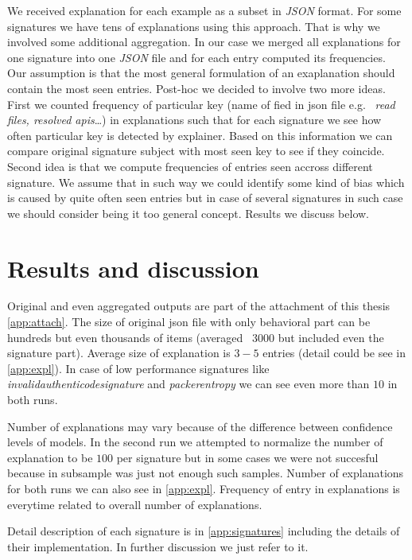 We received explanation for each example as a subset in \emph{JSON} format. For some signatures we have tens of explanations using this approach. That is why we involved some additional aggregation. In our case we merged all explanations for one signature into one \emph{JSON} file and for each entry computed its frequencies. Our assumption is that the most general formulation of an exaplanation should contain the most seen entries. Post-hoc we decided to involve two more ideas. First we counted frequency of particular key (name of fied in json file e.g. \ \emph{read files, resolved apis}\dots) in explanations such that for each signature we see how often particular key is detected by explainer. Based on this information we can compare original signature subject with most seen key to see if they coincide. Second idea is that we compute frequencies of entries seen accross different signature. We assume that in such way we could identify some kind of bias which is caused by quite often seen entries but in case of several signatures in such case we should consider being it too general concept. Results we discuss below.




\section{Results and discussion}
Original and even aggregated outputs are part of the attachment of this thesis \ref{app:attach}. The size of original json file with only behavioral part can be hundreds but even thousands of items (averaged \texttildelow~$3000$ but included even the signature part). Average size of explanation is $3-5$ entries (detail could be see in \ref{app:expl}). In case of low performance signatures like \emph{invalidauthenticodesignature} and \emph{packerentropy} we can see even more than $10$ in both runs.

Number of explanations may vary because of the difference between confidence levels of models. In the second run we attempted to normalize the number of explanation to be $100$ per signature but in some cases we were not succesful because in subsample was just not enough such samples. Number of explanations for both runs we can also see in \ref{app:expl}. Frequency of entry in explanations is everytime related to overall number of explanations.

Detail description of each signature is in \ref{app:signatures} including the details of their implementation. In further discussion we just refer to it.



